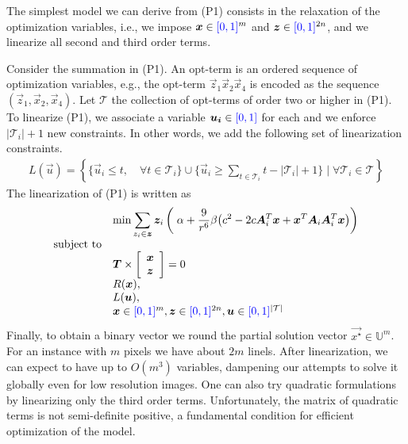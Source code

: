 	The simplest model we can derive from (P1) consists in the relaxation of the optimization variables, i.e., we impose $\bm{x} \in {\color{blue}{[0,1]}}^m$ and $\bm{z} \in {\color{blue}{[0,1]}}^{2n}$, and we linearize all second and third order terms. 
	
	Consider the summation in (P1). An opt-term is an ordered sequence of optimization variables, e.g., the opt-term $\vec{z}_1\vec{x}_2\vec{x}_4$ is encoded as the sequence $(\vec{z}_1,\vec{x}_2,\vec{x}_4)$. Let $\mathcal{T}$ the collection of opt-terms of order two or higher in (P1). To linearize (P1), we associate a variable $\bm{u_i} \in {\color{blue}{[0,1]}}$ for each  and we enforce $|\mathcal{T}_i|+1$ new constraints. In other words, we add the following set of linearization constraints.
\begin{align*}
	L(\vec{u}) = \left\{ \Big\{ \vec{u}_i \leq t, \quad \forall t \in \mathcal{T}_i \Big\} \cup \Big\{ \vec{u}_i \geq \displaystyle \sum_{t \in \mathcal{T}_i}{t} - |\mathcal{T}_i| + 1 \Big\} \; \Big| \; \forall \mathcal{T}_i \in \mathcal{T} \right\}
\end{align*}
%
%
%
The linearization of (P1) is written as
\begin{align*}
\begin{array}{ll}
& \displaystyle	\min \sum_{z_i \in \bm{z}}{ \bm{z}_i \left(\; \alpha + \frac{9}{r^6}\beta \big(c^2 - 2c\bm{A}_i^T\bm{x} + \bm{x}^T\bm{A}_i\bm{A}_i^T\bm{x}\big)\right)} \\
\text{subject to}\\
&	\bm{T} \times  \left[ \begin{array}{c}
							\bm{x} \\ 
							\bm{z} 
						   \end{array} \right] = 0 \\
&   R(\bm{x}),\\
&   L(\bm{u}),\\
&   \bm{x} \in {\color{blue}{[0,1]}}^{m}, \bm{z} \in {\color{blue}{[0,1]}}^{2n}, \bm{u} \in {\color{blue}{[0,1]}}^{|\mathcal{T}|} 
\end{array}
\end{align*}
%
	Finally, to obtain a binary vector we round the partial solution vector $\vec{x^{\star}} \in \mathbb{U}^m$. For an instance with $m$ pixels we have about $2m$ linels. After linearization, we can expect to have up to $O(m^3)$ variables, dampening our attempts to solve it globally even for low resolution images. One can also try quadratic formulations by linearizing only the third order terms. Unfortunately, the matrix of quadratic terms is not semi-definite positive, a fundamental condition for efficient optimization of the model.
	


